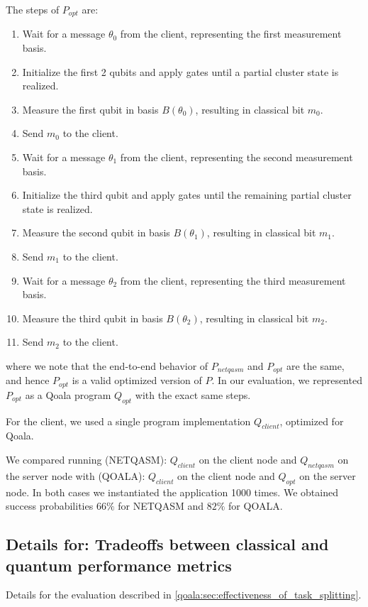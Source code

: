 The steps of $P_{opt}$ are:
\begin{enumerate}
  \item Wait for a message $\theta_0$ from the client, representing the first measurement basis.
  \item Initialize the first 2 qubits and apply gates until a partial cluster state is realized.
  \item Measure the first qubit in basis $B(\theta_0)$, resulting in classical bit $m_0$.
  \item Send $m_0$ to the client.
  \item Wait for a message $\theta_1$ from the client, representing the second measurement basis.
  \item Initialize the third qubit and apply gates until the remaining partial cluster state is realized.
  \item Measure the second qubit in basis $B(\theta_1)$, resulting in classical bit $m_1$.
  \item Send $m_1$ to the client.
  \item Wait for a message $\theta_2$ from the client, representing the third measurement basis.
  \item Measure the third qubit in basis $B(\theta_2)$, resulting in classical bit $m_2$.
  \item Send $m_2$ to the client.
\end{enumerate}
where we note that the end-to-end behavior of $P_{netqasm}$ and $P_{opt}$ are the same, and hence $P_{opt}$ is a valid optimized version of $P$.
In our evaluation, we represented $P_{opt}$ as a Qoala program $Q_{opt}$ with the exact same steps.

For the client, we used a single program implementation $Q_{client}$, optimized for Qoala.

We compared running (NETQASM): $Q_{client}$ on the client node and $Q_{netqasm}$ on the server node with (QOALA): $Q_{client}$ on the client node and $Q_{opt}$ on the server node. In both cases we instantiated the application 1000 times.
We obtained success probabilities $66\%$ for NETQASM and $82\%$ for QOALA.


\subsection{Details for: Tradeoffs between classical and quantum performance metrics}
Details for the evaluation described in \cref{qoala:sec:effectiveness_of_task_splitting}.

